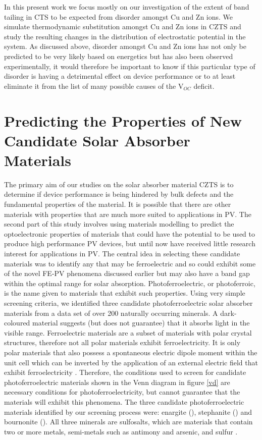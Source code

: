 In this present work we focus mostly on our investigation of the extent of band tailing in CTS to be expected from disorder amongst Cu and Zn ions. We simulate thermodynamic substitution amongst Cu and Zn ions in CZTS and study the resulting changes in the distribution of electrostatic potential in the system.
As discussed above, disorder amongst Cu and Zn ions has not only be predicted to be very likely based on energetics but has also been observed experimentally, it would therefore be important to know if this particular type of disorder is having a detrimental effect on device performance or to at least eliminate it from the list of many possible causes of the V$_{OC}$ deficit.
 


\section{Predicting the Properties of New Candidate Solar Absorber Materials}\label{sulfosalts_intro}
The primary aim of our studies on the solar absorber material CZTS is to determine if device performance is being hindered by bulk defects and the fundamental properties of the material. It is possible that there are other materials with properties that are much more suited to applications in PV.
The second part of this study involves using materials modelling to predict the optoelectronic properties of materials that could have the potential to be used to produce high performance PV devices, but until now have received little research interest for applications in PV.  The central idea in selecting these candidate materials was to identify any that may be ferroelectric and so could exhibit some of the novel FE-PV phenomena discussed earlier but may also have a band gap within the optimal range for solar absorption. Photoferroelectric, or photoferroic, is the name given to materials that exhibit such properties. 
Using very simple screening criteria, we identified three candidate photoferroelectric solar absorber materials from a data set of over 200 naturally occurring minerals. 
A dark-coloured material suggests (but does not guarantee) that it absorbs light in the visible range. Ferroelectric materials are a subset of materials with polar crystal structures, therefore not all polar materials exhibit ferroelectricity. It is only polar materials that also possess a spontaneous electric dipole moment within the unit cell which can be inverted by the application of an external electric field that exhibit ferroelectricity \cite{FE_subset}. 
Therefore, the conditions used to screen for candidate photoferroelectric materials shown in the Venn diagram in figure \ref{vd} are necessary conditions for photoferroelectricity, but cannot guarantee that the materials will exhibit this phenomena.
The three candidate photoferroelectric materials identified by our screening process were: enargite (\enargite), stephanite (\stephanite) and bournonite (\bournonite). All three minerals are sulfosalts, which are materials that contain two or more metals, semi-metals such as antimony and arsenic, and sulfur \cite{DK}. 

